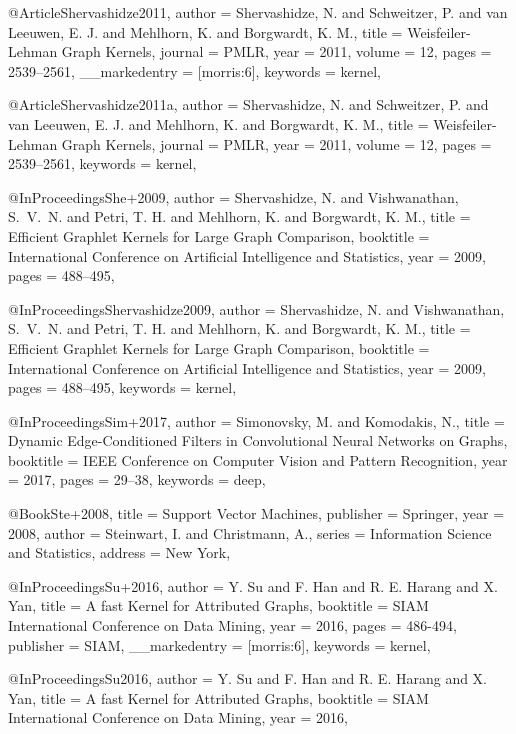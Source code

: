@Article{Shervashidze2011,
  author        = {Shervashidze, N. and Schweitzer, P. and van Leeuwen, E. J. and Mehlhorn, K. and Borgwardt, K. M.},
  title         = {Weisfeiler-{L}ehman Graph Kernels},
  journal       = {PMLR},
  year          = {2011},
  volume        = {12},
  pages         = {2539--2561},
  __markedentry = {[morris:6]},
  keywords      = {kernel},
}

@Article{Shervashidze2011a,
  author   = {Shervashidze, N. and Schweitzer, P. and van Leeuwen, E. J. and Mehlhorn, K. and Borgwardt, K. M.},
  title    = {Weisfeiler-{L}ehman Graph Kernels},
  journal  = {PMLR},
  year     = {2011},
  volume   = {12},
  pages    = {2539--2561},
  keywords = {kernel},
}

@InProceedings{She+2009,
  author    = {Shervashidze, N. and Vishwanathan, S.~V.~N. and Petri, T. H. and Mehlhorn, K. and Borgwardt, K. M.},
  title     = {Efficient Graphlet Kernels for Large Graph Comparison},
  booktitle = {International Conference on Artificial Intelligence and Statistics},
  year      = {2009},
  pages     = {488--495},
}

@InProceedings{Shervashidze2009,
  author    = {Shervashidze, N. and Vishwanathan, S.~V.~N. and Petri, T. H. and Mehlhorn, K. and Borgwardt, K. M.},
  title     = {Efficient Graphlet Kernels for Large Graph Comparison},
  booktitle = {International Conference on Artificial Intelligence and Statistics},
  year      = {2009},
  pages     = {488--495},
  keywords  = {kernel},
}

@InProceedings{Sim+2017,
  author    = {Simonovsky, M. and Komodakis, N.},
  title     = {Dynamic Edge-Conditioned Filters in Convolutional Neural Networks on Graphs},
  booktitle = {IEEE Conference on Computer Vision and Pattern Recognition},
  year      = {2017},
  pages     = {29--38},
  keywords  = {deep},
}

@Book{Ste+2008,
  title     = {Support Vector Machines},
  publisher = {Springer},
  year      = {2008},
  author    = {Steinwart, I. and Christmann, A.},
  series    = {Information Science and Statistics},
  address   = {New York},
}

@InProceedings{Su+2016,
  author        = {Y. Su and F. Han and R. E. Harang and X. Yan},
  title         = {A fast Kernel for Attributed Graphs},
  booktitle     = {SIAM International Conference on Data Mining},
  year          = {2016},
  pages         = {486-494},
  publisher     = {SIAM},
  __markedentry = {[morris:6]},
  keywords      = {kernel},
}

@InProceedings{Su2016,
  author    = {Y. Su and F. Han and R. E. Harang and X. Yan},
  title     = {A fast Kernel for Attributed Graphs},
  booktitle = {SIAM International Conference on Data Mining},
  year      = {2016},
}

